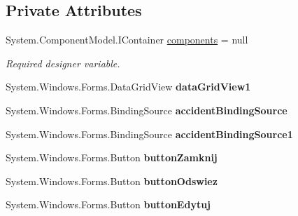\subsection*{Private Attributes}
\begin{DoxyCompactItemize}
\item 
System.\+Component\+Model.\+I\+Container \mbox{\hyperlink{class_statystyki___o_s_p_1_1_accident_list_form_acfc9bd253e3fad1c140881dbffbf5e6b}{components}} = null
\begin{DoxyCompactList}\small\item\em Required designer variable. \end{DoxyCompactList}\item 
\mbox{\label{class_statystyki___o_s_p_1_1_accident_list_form_a77dafba0456869954481856e86031a85}} 
System.\+Windows.\+Forms.\+Data\+Grid\+View {\bfseries data\+Grid\+View1}
\item 
\mbox{\label{class_statystyki___o_s_p_1_1_accident_list_form_a91bf2bed9ddb260baeb2109d00f48577}} 
System.\+Windows.\+Forms.\+Binding\+Source {\bfseries accident\+Binding\+Source}
\item 
\mbox{\label{class_statystyki___o_s_p_1_1_accident_list_form_ac4355d63f31bd7bb04c985ed1a90faa3}} 
System.\+Windows.\+Forms.\+Binding\+Source {\bfseries accident\+Binding\+Source1}
\item 
\mbox{\label{class_statystyki___o_s_p_1_1_accident_list_form_aa840d7d7a8dd5fbf4df4a83b063995be}} 
System.\+Windows.\+Forms.\+Button {\bfseries button\+Zamknij}
\item 
\mbox{\label{class_statystyki___o_s_p_1_1_accident_list_form_a5bb5f0ded9f037e520baec7582a330d5}} 
System.\+Windows.\+Forms.\+Button {\bfseries button\+Odswiez}
\item 
\mbox{\label{class_statystyki___o_s_p_1_1_accident_list_form_aa65b29f8e9cc25658da47713fd88f60f}} 
System.\+Windows.\+Forms.\+Button {\bfseries button\+Edytuj}
\item 
\mbox{\label{class_statystyki___o_s_p_1_1_accident_list_form_aed87c08589136aa7357e4092214511b0}} 

\end{DoxyCompactItemize}
